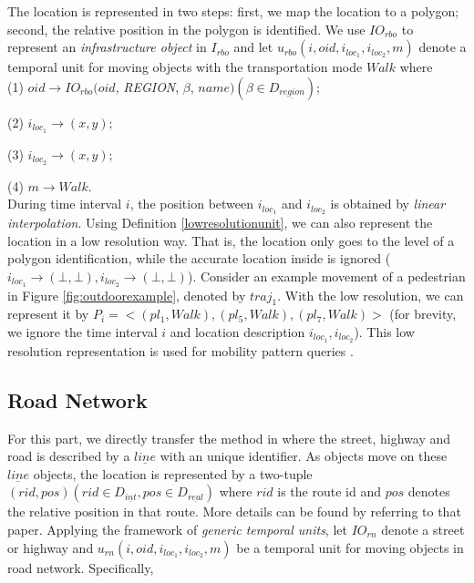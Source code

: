 The location is represented in two steps: first, we map the location to a polygon; second, the relative position in the 
polygon is identified. We use $IO_{rbo}$ to represent an \textit{infrastructure object} in 
$I_{rbo}$ and let $u_{rbo}(i,oid,i_{loc_1},i_{loc_2},m)$ denote a temporal unit for moving objects with the transportation mode $Walk$ where  \\

(1) $oid \rightarrow IO_{rbo}(oid$, \textit{REGION}, $\beta$, $name) (\beta \in D_{\underline{region}})$; 

(2) $i_{loc_1} \rightarrow (x,y)$;

(3) $i_{loc_2} \rightarrow (x,y)$;

(4) $m \rightarrow Walk$. \\

During time interval $i$, the position between $i_{loc_1}$ and $i_{loc_2}$ is obtained by \textit{linear interpolation}. Using Definition \ref{lowresolutionunit}, we can also 
represent the location in a low resolution way. That is, the location only goes to the level of a
polygon identification, while the accurate location inside is ignored 
($i_{loc_1}\rightarrow (\bot,\bot), i_{loc_2}\rightarrow (\bot,\bot)$). 
Consider an example movement of a pedestrian in Figure 
\ref{fig:outdoorexample}, denoted by $traj_1$. With the low resolution, we can represent 
it by $P_i=<(pl_1,Walk),(pl_5,Walk),(pl_7,Walk)>$ 
(for brevity, we ignore the time interval $i$ and location description $i_{loc_1},i_{loc_2}$). 
This low resolution representation is used for mobility pattern queries \cite{MR05}. 


\subsection{Road Network}
\label{sec:roadnetwork}

For this part, we directly transfer the method in \cite{GA2006} where the street, 
highway and road is described by a $\underline{line}$ with an unique identifier. 
As objects move on these $\underline{line}$ objects, the location is represented 
by a two-tuple $(rid, pos) (rid \in D_{\underline{int}}, pos \in D_{\underline{real}})$ 
where $rid$ is the route id and $pos$ denotes the relative position in that route.  
More details can be found by referring to that paper. Applying the framework of 
\textit{generic temporal units}, let $IO_{rn}$ denote a street or highway and $u_{rn}(i,oid,i_{loc_1},i_{loc_2},m)$ be a temporal unit for moving objects in road network. Specifically, \\

